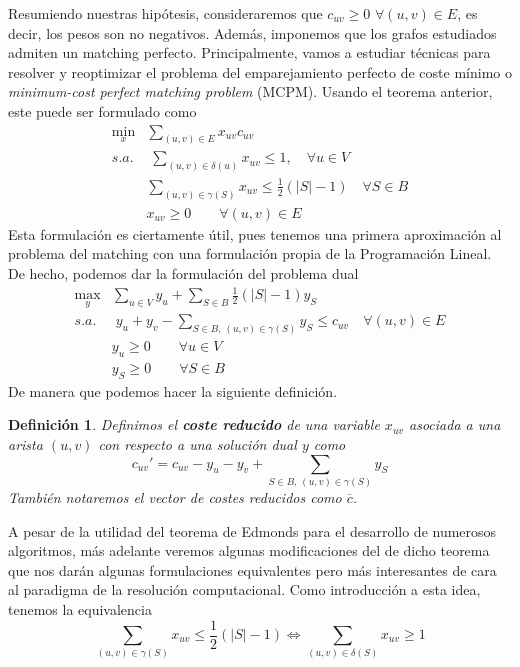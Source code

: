 \documentclass[twoside,a4paper,openright,12pt,tikz]{book}
\newtheorem{defi}{Definici\'on}[section]
\begin{document}
Resumiendo nuestras hipótesis, consideraremos que $c_{uv}\geq 0$ $\forall (u,v)\in E$, es decir, los pesos son no negativos. Además, imponemos que los grafos estudiados admiten un matching perfecto. Principalmente, vamos a estudiar técnicas para resolver y reoptimizar el problema del emparejamiento perfecto de coste mínimo o \textit{minimum-cost perfect matching problem} (MCPM). Usando el teorema anterior, este puede ser formulado como
\begin{align*}
\min_x & \sum_{(u,v) \in E}x_{uv}c_{uv}\\
s.a.&\;\sum_{(u,v)\in\delta(u)} x_{uv} \leq 1, \quad \forall u \in V\\
&\sum_{(u,v)\in \gamma(S)} x_{uv} \leq \frac{1}{2}(|S|-1)\quad \forall S \in B	\\
&x_{uv} \geq 0 \qquad \forall(u,v)\in E
\end{align*}
Esta formulación es ciertamente útil, pues tenemos una primera aproximación al problema del matching con una formulación propia de la Programación Lineal. De hecho, podemos dar la formulación del problema dual
\begin{align*}
\max_y & \sum_{u\in V}y_u + \sum_{S\in B}\frac{1}{2}(|S|-1)y_S\\
s.a.&\;y_u+y_v - \sum_{S\in B,\,(u,v)\in \gamma(S)} y_S \leq c_{uv} \quad \forall (u,v)\in E\\
&y_u \geq 0 \qquad \forall u\in V\\
&y_S \geq 0 \qquad \forall S\in B
\end{align*}
De manera que podemos hacer la siguiente definición.
\begin{defi}
Definimos el \textbf{coste reducido} de una variable $x_{uv}$ asociada a una arista $(u,v)$ con respecto a una solución dual $y$ como
$$
c_{uv}' = c_{uv} -y_u - y_v + \sum_{S\in B,\,(u,v)\in \gamma(S)}y_S 
$$
También notaremos el vector de costes reducidos como $\overline{c}$.
\end{defi}

A pesar de la utilidad del teorema de Edmonds para el desarrollo de numerosos algoritmos, más adelante veremos algunas modificaciones del de dicho teorema que nos darán algunas formulaciones equivalentes pero más interesantes de cara al paradigma de la resolución computacional. Como introducción a esta idea, tenemos la equivalencia
$$
\sum_{(u,v)\in \gamma(S)} x_{uv} \leq \frac{1}{2}(|S|-1) \Leftrightarrow \sum_{(u,v)\in \delta(S)} x_{uv} \geq 1
$$
\newpage
\end{document}
